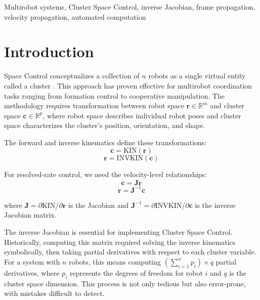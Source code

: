 \documentclass[lettersize,journal]{IEEEtran}
\begin{document}
\begin{IEEEkeywords}
Multirobot systems, Cluster Space Control, inverse Jacobian, frame propagation, velocity propagation, automated computation
\end{IEEEkeywords}

\section{Introduction}

 Space Control conceptualizes a collection of $n$ robots as a single virtual entity called a cluster \cite{ref1}. This approach has proven effective for multirobot coordination tasks ranging from formation control to cooperative manipulation. The methodology requires transformation between robot space $\mathbf{r} \in \mathbb{R}^m$ and cluster space $\mathbf{c} \in \mathbb{R}^p$, where robot space describes individual robot poses and cluster space characterizes the cluster's position, orientation, and shape.

The forward and inverse kinematics define these transformations:
\begin{equation}
\mathbf{c} = \text{KIN}(\mathbf{r})
\end{equation}
\begin{equation}
\mathbf{r} = \text{INVKIN}(\mathbf{c})
\end{equation}

For resolved-rate control, we need the velocity-level relationships:
\begin{equation}
\dot{\mathbf{c}} = \mathbf{J}\dot{\mathbf{r}}
\end{equation}
\begin{equation}
\dot{\mathbf{r}} = \mathbf{J}^{-1}\dot{\mathbf{c}}
\end{equation}

where $\mathbf{J} = \partial\text{KIN}/\partial\mathbf{r}$ is the Jacobian and $\mathbf{J}^{-1} = \partial\text{INVKIN}/\partial\mathbf{c}$ is the inverse Jacobian matrix.

The inverse Jacobian is essential for implementing Cluster Space Control. Historically, computing this matrix required solving the inverse kinematics symbolically, then taking partial derivatives with respect to each cluster variable. For a system with $n$ robots, this means computing $(\sum_{i=1}^{n} p_i) \times q$ partial derivatives, where $p_i$ represents the degrees of freedom for robot $i$ and $q$ is the cluster space dimension. This process is not only tedious but also error-prone, with mistakes difficult to detect.
\end{document}
